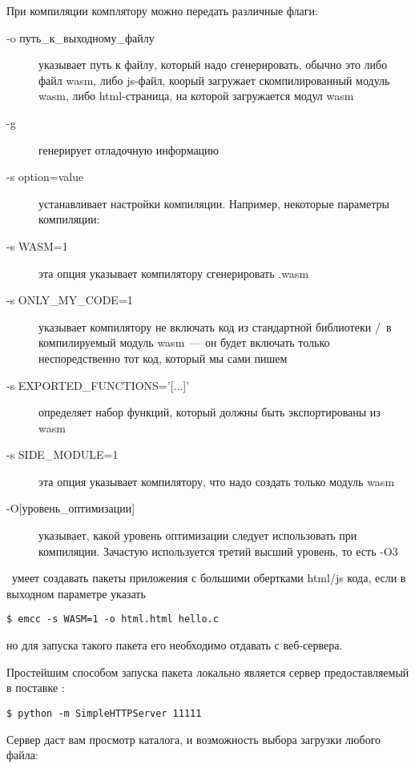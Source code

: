 При компиляции комплятору можно передать различные флаги:
\begin{description}

\item[-o путь\_к\_выходному\_файлу] указывает путь к файлу, который надо
сгенерировать, обычно это либо файл wasm, либо js-файл, коорый загружает
скомпилированный модуль wasm, либо html-страница, на которой загружается модул
wasm

\item[-g] генерирует отладочную информацию

\item[-s option=value] устанавливает настройки компиляции. Например, некоторые
параметры компиляции:

\item[-s WASM=1] эта опция указывает компилятору сгенерировать .wasm

\item[-s ONLY\_MY\_CODE=1] указывает компилятору не включать код из стандартной
библиотеки \emc/\cpp\ в компилируемый модуль wasm\ --- он будет включать только
неспоредственно тот код, который мы сами пишем

\item[-s EXPORTED\_FUNCTIONS='{[}...{]}'] определяет набор функций, который
должны быть экспортированы из wasm

\item[-s SIDE\_MODULE=1] эта опция указывает компилятору, что надо создать
только модуль wasm

\item[-O{[}уровень\_оптимизации{]}] указывает, какой уровень оптимизации следует
использовать при компиляции. Зачастую используется третий высший уровень, то
есть -O3

\end{description}


\ems\ умеет создавать пакеты приложения с большими обертками html/js кода, если
в выходном параметре указать
\begin{verbatim}
$ emcc -s WASM=1 -o html.html hello.c
\end{verbatim}
но для запуска такого пакета его необходимо отдавать с веб-сервера.

Простейшим способом запуска пакета локально является сервер предоставляемый в
поставке \py:
\begin{verbatim}
$ python -m SimpleHTTPServer 11111
\end{verbatim}

Сервер даст вам просмотр каталога, и возможность выбора загрузки любого файла:

\bigskip
{}

\secup
